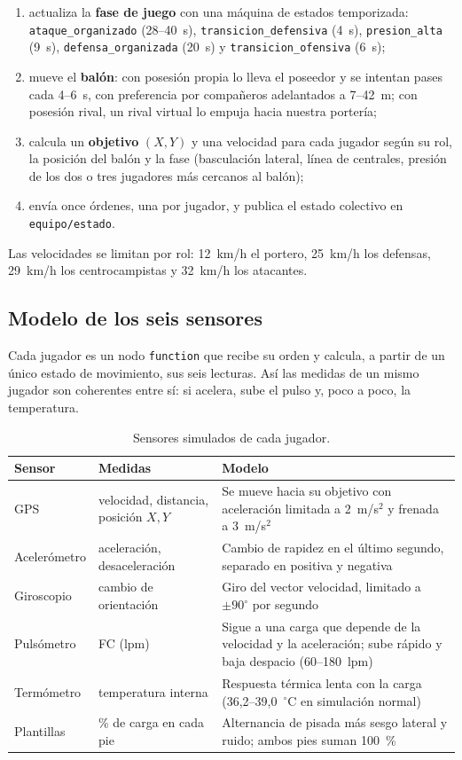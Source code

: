 \documentclass[runningheads]{llncs}
\newcommand{\topic}[1]{\texttt{#1}}
\begin{document}
\begin{enumerate}
  \item actualiza la \textbf{fase de juego} con una máquina de estados temporizada: \texttt{ataque\_organizado} (28--40~s), \texttt{transicion\_defensiva} (4~s), \texttt{presion\_alta} (9~s), \texttt{defensa\_organizada} (20~s) y \texttt{transicion\_ofensiva} (6~s);
  \item mueve el \textbf{balón}: con posesión propia lo lleva el poseedor y se intentan pases cada 4--6~s, con preferencia por compañeros adelantados a 7--42~m; con posesión rival, un rival virtual lo empuja hacia nuestra portería;
  \item calcula un \textbf{objetivo} $(X,Y)$ y una velocidad para cada jugador según su rol, la posición del balón y la fase (basculación lateral, línea de centrales, presión de los dos o tres jugadores más cercanos al balón);
  \item envía once órdenes, una por jugador, y publica el estado colectivo en \topic{equipo/estado}.
\end{enumerate}

Las velocidades se limitan por rol: 12~km/h el portero, 25~km/h los defensas, 29~km/h los centrocampistas y 32~km/h los atacantes.

\subsection{Modelo de los seis sensores}

Cada jugador es un nodo \texttt{function} que recibe su orden y calcula, a partir de un único estado de movimiento, sus seis lecturas. Así las medidas de un mismo jugador son coherentes entre sí: si acelera, sube el pulso y, poco a poco, la temperatura.

\begin{table}[!htbp]
\centering
\caption{Sensores simulados de cada jugador.}\label{tab:sensores}
\footnotesize
\begin{tabularx}{\textwidth}{p{2.3cm}p{3.6cm}L}
\toprule
\textbf{Sensor} & \textbf{Medidas} & \textbf{Modelo} \\
\midrule
GPS & velocidad, distancia, posición $X,Y$ & Se mueve hacia su objetivo con aceleración limitada a 2~m/s$^2$ y frenada a 3~m/s$^2$ \\
Acelerómetro & aceleración, desaceleración & Cambio de rapidez en el último segundo, separado en positiva y negativa \\
Giroscopio & cambio de orientación & Giro del vector velocidad, limitado a $\pm90^\circ$ por segundo \\
Pulsómetro & FC (lpm) & Sigue a una carga que depende de la velocidad y la aceleración; sube rápido y baja despacio (60--180~lpm) \\
Termómetro & temperatura interna & Respuesta térmica lenta con la carga (36,2--39,0~$^\circ$C en simulación normal) \\
Plantillas & \% de carga en cada pie & Alternancia de pisada más sesgo lateral y ruido; ambos pies suman 100~\% \\
\bottomrule
\end{tabularx}
\end{table}
\end{document}
